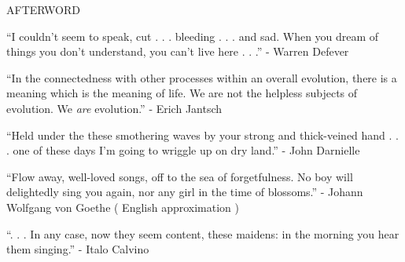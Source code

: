 \documentclass[11pt]{article}
\begin{document}
\begingroup
\begin{center}
\huge AFTERWORD
\end{center}
\endgroup

\vspace*{2\baselineskip}

\begingroup
\begin{center}
``I couldn't seem to speak, cut . . . bleeding . . . and sad. When you dream of things you don't understand, you can't live here . . .''
\rightskip\leftskip
\phantom{text} \hfill - Warren Defever
\end{center}
\endgroup

\vspace*{4\baselineskip}

\begingroup
\begin{center}
``In the connectedness with other processes within an overall evolution, there is a meaning which is the meaning of life. We are not the helpless subjects of evolution. We  \textit{are} evolution.'' 
\rightskip\leftskip
\phantom{text} \hfill - Erich Jantsch
\end{center}
\endgroup

\vspace*{4\baselineskip}

\begingroup
\begin{center}
``Held under the these smothering waves by your strong and thick-veined hand . . . one of these days I'm going to wriggle up on dry land.''
\rightskip\leftskip
\phantom{text} \hfill - John Darnielle
\end{center}
\endgroup

\vspace*{4\baselineskip}

\begingroup
\begin{center}
``Flow away, well-loved songs, off to the sea of forgetfulness. No boy will delightedly sing you again, nor any girl in the time of blossoms.''
\rightskip\leftskip
\phantom{text} \hfill - Johann Wolfgang von Goethe ( English approximation )
\end{center}
\endgroup

\vspace*{4\baselineskip}

\begingroup
\begin{center}
``. . . In any case, now they seem content, these maidens: in the morning you hear them singing.''
\rightskip\leftskip
\phantom{text} \hfill - Italo Calvino
\end{center}
\endgroup
\end{document}
